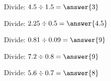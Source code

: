 \documentclass{ximera}
\begin{document}
\begin{problem}
Divide: $4.5 \div 1.5 = \answer{3}$
\end{problem}

\begin{problem}
Divide: $2.25 \div 0.5 = \answer{4.5}$
\end{problem}

\begin{problem}
Divide: $0.81 \div 0.09 = \answer{9}$
\end{problem}

\begin{problem}
Divide: $7.2 \div 0.8 = \answer{9}$
\end{problem}

\begin{problem}
Divide: $5.6 \div 0.7 = \answer{8}$
\end{problem}

\end{document}
